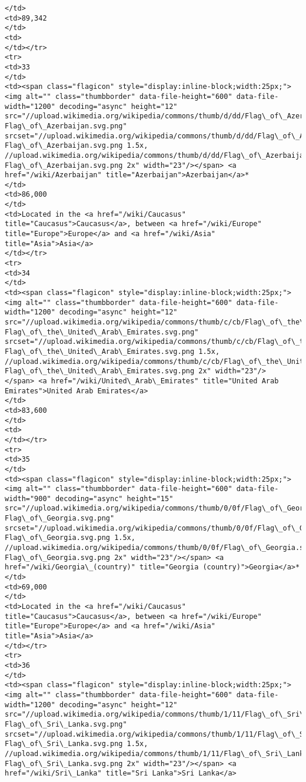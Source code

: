 \documentclass[11pt]{article}
\begin{document}
\begin{Verbatim}[commandchars=\\\{\}]
</td>
<td>89,342
</td>
<td>
</td></tr>
<tr>
<td>33
</td>
<td><span class="flagicon" style="display:inline-block;width:25px;"><img alt="" class="thumbborder" data-file-height="600" data-file-width="1200" decoding="async" height="12" src="//upload.wikimedia.org/wikipedia/commons/thumb/d/dd/Flag\_of\_Azerbaijan.svg/23px-Flag\_of\_Azerbaijan.svg.png" srcset="//upload.wikimedia.org/wikipedia/commons/thumb/d/dd/Flag\_of\_Azerbaijan.svg/35px-Flag\_of\_Azerbaijan.svg.png 1.5x, //upload.wikimedia.org/wikipedia/commons/thumb/d/dd/Flag\_of\_Azerbaijan.svg/46px-Flag\_of\_Azerbaijan.svg.png 2x" width="23"/></span> <a href="/wiki/Azerbaijan" title="Azerbaijan">Azerbaijan</a>*
</td>
<td>86,000
</td>
<td>Located in the <a href="/wiki/Caucasus" title="Caucasus">Caucasus</a>, between <a href="/wiki/Europe" title="Europe">Europe</a> and <a href="/wiki/Asia" title="Asia">Asia</a>
</td></tr>
<tr>
<td>34
</td>
<td><span class="flagicon" style="display:inline-block;width:25px;"><img alt="" class="thumbborder" data-file-height="600" data-file-width="1200" decoding="async" height="12" src="//upload.wikimedia.org/wikipedia/commons/thumb/c/cb/Flag\_of\_the\_United\_Arab\_Emirates.svg/23px-Flag\_of\_the\_United\_Arab\_Emirates.svg.png" srcset="//upload.wikimedia.org/wikipedia/commons/thumb/c/cb/Flag\_of\_the\_United\_Arab\_Emirates.svg/35px-Flag\_of\_the\_United\_Arab\_Emirates.svg.png 1.5x, //upload.wikimedia.org/wikipedia/commons/thumb/c/cb/Flag\_of\_the\_United\_Arab\_Emirates.svg/46px-Flag\_of\_the\_United\_Arab\_Emirates.svg.png 2x" width="23"/></span> <a href="/wiki/United\_Arab\_Emirates" title="United Arab Emirates">United Arab Emirates</a>
</td>
<td>83,600
</td>
<td>
</td></tr>
<tr>
<td>35
</td>
<td><span class="flagicon" style="display:inline-block;width:25px;"><img alt="" class="thumbborder" data-file-height="600" data-file-width="900" decoding="async" height="15" src="//upload.wikimedia.org/wikipedia/commons/thumb/0/0f/Flag\_of\_Georgia.svg/23px-Flag\_of\_Georgia.svg.png" srcset="//upload.wikimedia.org/wikipedia/commons/thumb/0/0f/Flag\_of\_Georgia.svg/35px-Flag\_of\_Georgia.svg.png 1.5x, //upload.wikimedia.org/wikipedia/commons/thumb/0/0f/Flag\_of\_Georgia.svg/45px-Flag\_of\_Georgia.svg.png 2x" width="23"/></span> <a href="/wiki/Georgia\_(country)" title="Georgia (country)">Georgia</a>*
</td>
<td>69,000
</td>
<td>Located in the <a href="/wiki/Caucasus" title="Caucasus">Caucasus</a>, between <a href="/wiki/Europe" title="Europe">Europe</a> and <a href="/wiki/Asia" title="Asia">Asia</a>
</td></tr>
<tr>
<td>36
</td>
<td><span class="flagicon" style="display:inline-block;width:25px;"><img alt="" class="thumbborder" data-file-height="600" data-file-width="1200" decoding="async" height="12" src="//upload.wikimedia.org/wikipedia/commons/thumb/1/11/Flag\_of\_Sri\_Lanka.svg/23px-Flag\_of\_Sri\_Lanka.svg.png" srcset="//upload.wikimedia.org/wikipedia/commons/thumb/1/11/Flag\_of\_Sri\_Lanka.svg/35px-Flag\_of\_Sri\_Lanka.svg.png 1.5x, //upload.wikimedia.org/wikipedia/commons/thumb/1/11/Flag\_of\_Sri\_Lanka.svg/46px-Flag\_of\_Sri\_Lanka.svg.png 2x" width="23"/></span> <a href="/wiki/Sri\_Lanka" title="Sri Lanka">Sri Lanka</a>

\end{Verbatim}
\end{document}
